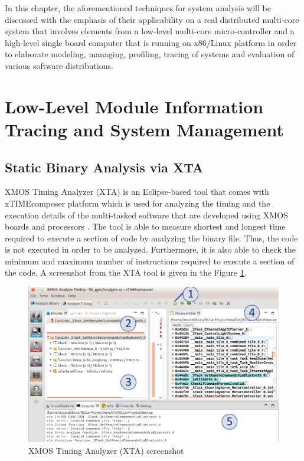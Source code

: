 In this chapter, the aforementioned techniques for system analysis will be discussed with the emphasis of their applicability on a real distributed multi-core system that involves elements from a low-level multi-core micro-controller and a high-level single board computer that is running on x86/Linux platform in order to elaborate  modeling, managing, profiling, tracing of systems and evaluation of various software distributions.

\section{Low-Level Module Information Tracing and System Management}
\subsection{Static Binary Analysis via XTA} \label{staticbinary}
XMOS Timing Analyzer (XTA) \cite{xtamanual} is an Eclipse-based tool that comes with xTIMEcomposer platform which is used for analyzing the timing and the execution details of the multi-tasked software that are developed using XMOS boards and processors \cite{xtamanual}. The tool is able to measure shortest and longest time required to execute a section of code by analyzing the binary file. Thus, the code is not executed in order to be analyzed. Furthermore, it is also able to check the minimum and maximum number of instructions required to execute a section of the code.  A screenshot from the XTA tool is given in the Figure \ref{fig:xtass}.

\begin{figure}[!ht]
	\centering
	\captionsetup{justification=centering}
	\includegraphics[width=\textwidth]{content/images/xtass.png}
	\caption{XMOS Timing Analyzer (XTA) screenshot}
	\label{fig:xtass}
\end{figure}

